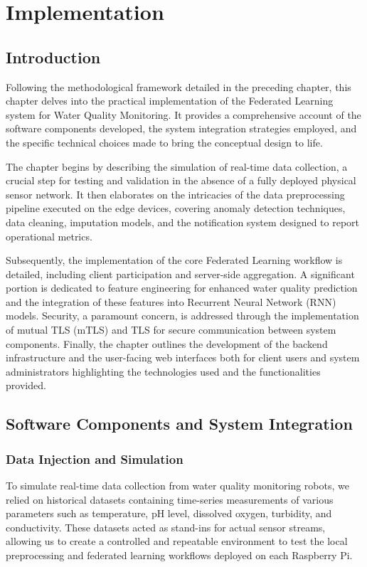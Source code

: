 \chapter{Implementation}
\label{chap:Chapter 4 title}


\section*{Introduction}
Following the methodological framework detailed in the preceding chapter, this chapter delves into the practical implementation of the Federated Learning system for Water Quality Monitoring. It provides a comprehensive account of the software components developed, the system integration strategies employed, and the specific technical choices made to bring the conceptual design to life.

The chapter begins by describing the simulation of real-time data collection, a crucial step for testing and validation in the absence of a fully deployed physical sensor network. It then elaborates on the intricacies of the data preprocessing pipeline executed on the edge devices, covering anomaly detection techniques, data cleaning, imputation models, and the notification system designed to report operational metrics.

Subsequently, the implementation of the core Federated Learning workflow is detailed, including client participation and server-side aggregation. A significant portion is dedicated to feature engineering for enhanced water quality prediction and the integration of these features into Recurrent Neural Network (RNN) models. Security, a paramount concern, is addressed through the implementation of mutual TLS (mTLS) and TLS for secure communication between system components. Finally, the chapter outlines the development of the backend infrastructure and the user-facing web interfaces both for client users and system administrators highlighting the technologies used and the functionalities provided.

\pagebreak



\section{Software Components and System Integration}

\subsection{Data Injection and Simulation}
To simulate real-time data collection from water quality monitoring robots, we relied on historical datasets containing time-series measurements of various parameters such as temperature, pH level, dissolved oxygen, turbidity, and conductivity. These datasets acted as stand-ins for actual sensor streams, allowing us to create a controlled and repeatable environment to test the local preprocessing and federated learning workflows deployed on each Raspberry Pi.

